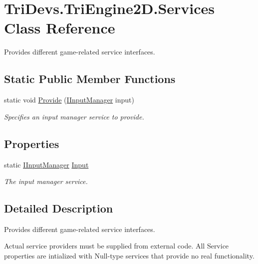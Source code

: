 \hypertarget{class_tri_devs_1_1_tri_engine2_d_1_1_services}{\section{Tri\-Devs.\-Tri\-Engine2\-D.\-Services Class Reference}
\label{class_tri_devs_1_1_tri_engine2_d_1_1_services}
}


Provides different game-\/related service interfaces.  


\subsection*{Static Public Member Functions}
\begin{DoxyCompactItemize}
\item 
static void \hyperlink{class_tri_devs_1_1_tri_engine2_d_1_1_services_a00f67457bccbe0ac69e969dc65181773}{Provide} (\hyperlink{interface_tri_devs_1_1_tri_engine2_d_1_1_input_1_1_i_input_manager}{I\-Input\-Manager} input)
\begin{DoxyCompactList}\small\item\em Specifies an input manager service to provide. \end{DoxyCompactList}\end{DoxyCompactItemize}
\subsection*{Properties}
\begin{DoxyCompactItemize}
\item 
static \hyperlink{interface_tri_devs_1_1_tri_engine2_d_1_1_input_1_1_i_input_manager}{I\-Input\-Manager} \hyperlink{class_tri_devs_1_1_tri_engine2_d_1_1_services_ab49cfe6c3d5dd9bd45b58b7599f1355d}{Input}
\begin{DoxyCompactList}\small\item\em The input manager service. \end{DoxyCompactList}\end{DoxyCompactItemize}


\subsection{Detailed Description}
Provides different game-\/related service interfaces. 

Actual service providers must be supplied from external code. All Service properties are intialized with Null-\/type services that provide no real functionality. 

